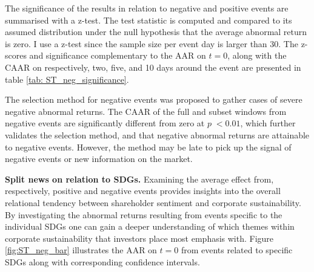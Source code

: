 The significance of the results in relation to negative and positive events are summarised with a z-test. The test statistic is computed and compared to its assumed distribution under the null hypothesis that the average abnormal return is zero. I use a z-test since the sample size per event day is larger than 30. The z-scores and significance complementary to the AAR on $t=0$, along with the CAAR on respectively, two, five, and 10 days around the event are presented in table \ref{tab: ST_neg_significance}.   

The selection method for negative events was proposed to gather cases of severe negative abnormal returns. The CAAR of the full and subset windows from negative events are significantly different from zero at $p \; < 0.01$, which further validates the selection method, and that negative abnormal returns are attainable to negative events. However, the method may be late to pick up the signal of negative events or new information on the market.  



\noindent \textbf{Split news on relation to SDGs.} Examining the average effect from, respectively, positive and negative events provides insights into the overall relational tendency between shareholder sentiment and corporate sustainability. By investigating the abnormal returns resulting from events specific to the individual SDGs one can gain a deeper understanding of which themes within corporate sustainability that investors place most emphasis with. Figure \ref{fig:ST_neg_bar} illustrates the AAR on $t=0$ from events related to specific SDGs along with corresponding confidence intervals. 


